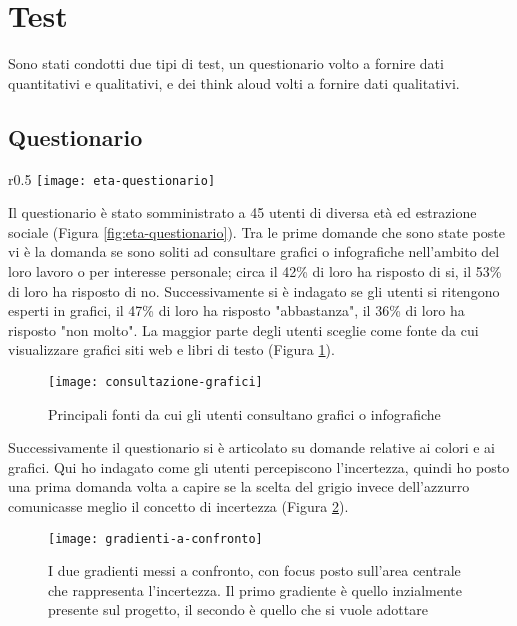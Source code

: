 \section{Test}
Sono stati condotti due tipi di test, un questionario volto a fornire dati quantitativi e qualitativi, e dei think aloud volti a fornire dati qualitativi. \\

\subsection{Questionario}
\begin{wrapfigure}{r}{0.5\textwidth}
    \centering
    \texttt{[image: eta-questionario]}
    \caption{Età degli utenti che hanno risposto al questionario}
    \label{fig:eta-questionario}
\end{wrapfigure}

Il questionario è stato somministrato a 45 utenti di diversa età ed estrazione sociale (Figura \ref{fig:eta-questionario}). Tra le prime domande che sono state poste vi è la domanda se sono soliti ad consultare grafici o infografiche nell'ambito del loro lavoro o per interesse personale; circa il 42\% di loro ha risposto di si, il 53\% di loro ha risposto di no. Successivamente si è indagato se gli utenti si ritengono esperti in grafici, il 47\% di loro ha risposto "abbastanza", il 36\% di loro ha risposto "non molto". La maggior parte degli utenti sceglie come fonte da cui visualizzare grafici siti web e libri di testo (Figura \ref{fig:consultazione-grafici}).\\

\begin{figure}[!ht] 
    \centering 
    \texttt{[image: consultazione-grafici]} 
    \caption{Principali fonti da cui gli utenti consultano grafici o infografiche}
    \label{fig:consultazione-grafici}
\end{figure}

Successivamente il questionario si è articolato su domande relative ai colori e ai grafici. Qui ho indagato come gli utenti percepiscono l'incertezza, quindi ho posto una prima domanda volta a capire se la scelta del grigio invece dell'azzurro comunicasse meglio il concetto di incertezza (Figura \ref{fig:gradienti-a-confronto}). 

\begin{figure}[!ht] 
    \centering 
    \texttt{[image: gradienti-a-confronto]} 
    \caption{I due gradienti messi a confronto, con focus posto sull'area centrale che rappresenta l'incertezza. Il primo gradiente è quello inzialmente presente sul progetto, il secondo è quello che si vuole adottare}
    \label{fig:gradienti-a-confronto}
\end{figure}


